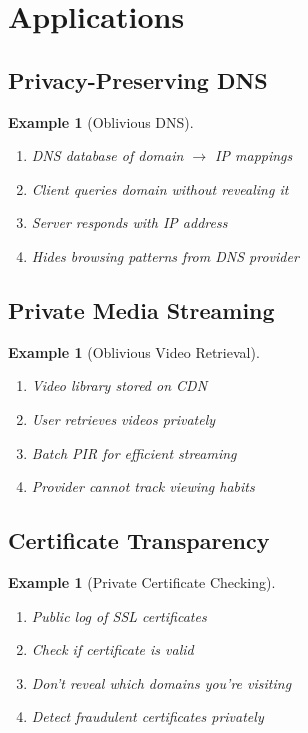 \documentclass[11pt,final]{article}
\newtheorem{example}[theorem]{Example}
\begin{document}
\section{Applications}

\subsection{Privacy-Preserving DNS}

\begin{example}[Oblivious DNS]
\begin{enumerate}
    \item DNS database of domain $\to$ IP mappings
    \item Client queries domain without revealing it
    \item Server responds with IP address
    \item Hides browsing patterns from DNS provider
\end{enumerate}
\end{example}

\subsection{Private Media Streaming}

\begin{example}[Oblivious Video Retrieval]
\begin{enumerate}
    \item Video library stored on CDN
    \item User retrieves videos privately
    \item Batch PIR for efficient streaming
    \item Provider cannot track viewing habits
\end{enumerate}
\end{example}

\subsection{Certificate Transparency}

\begin{example}[Private Certificate Checking]
\begin{enumerate}
    \item Public log of SSL certificates
    \item Check if certificate is valid
    \item Don't reveal which domains you're visiting
    \item Detect fraudulent certificates privately
\end{enumerate}
\end{example}
\end{document}
